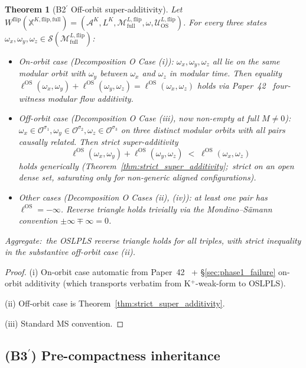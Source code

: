 \documentclass[11pt,a4paper]{article}
\theoremstyle{plain}
\newtheorem{theorem}{Theorem}[section]
\theoremstyle{definition}
\newcommand{\Acal}{\mathcal{A}}
\newcommand{\Scal}{\mathcal{S}}
\newcommand{\Mcal}{\mathcal{M}}
\newcommand{\Ucal}{\mathcal{U}}
\newcommand{\Ocal}{\mathcal{O}}
\newcommand{\ellOS}{\ell^{\mathrm{OS}}}
\newcommand{\Mflipfull}{\Mcal^{L,\mathrm{flip}}_{\mathrm{full}}}
\newcommand{\Wflip}{W^{\mathrm{flip}}}
\newcommand{\osXkrein}{\mathbb{X}^{K,\mathrm{flip},\mathrm{full}}}
\newcommand{\Oorb}[1]{\Ocal^{\sigma_{#1}}}
\begin{document}
\begin{theorem}[B2$^{\prime}$ Off-orbit super-additivity]
\label{thm:b2prime}
Let $\Wflip(\osXkrein)=(\Acal^{K},L^{K},\Mflipfull,\omega,
\Ucal^{L,\mathrm{flip}}_{\mathrm{OS}})$. For every three states
$\omega_{x},\omega_{y},\omega_{z}\in\Scal(\Mflipfull)$:
\begin{itemize}
\item[(i)] \emph{On-orbit case (Decomposition O Case (i)):}
$\omega_{x},\omega_{y},\omega_{z}$ all lie on the same modular orbit
with $\omega_{y}$ between $\omega_{x}$ and $\omega_{z}$ in modular
time. Then equality
$\ellOS(\omega_{x},\omega_{y})+\ellOS(\omega_{y},\omega_{z})=
\ellOS(\omega_{x},\omega_{z})$ holds via Paper~42~\cite{paper42}
four-witness modular flow additivity.
\item[(ii)] \emph{Off-orbit case (Decomposition O Case (iii), now
non-empty at full $M\ne 0$):} $\omega_{x}\in\Oorb{1},
\omega_{y}\in\Oorb{2},\omega_{z}\in\Oorb{3}$ on three distinct
modular orbits with all pairs causally related. Then strict
super-additivity
\[
  \ellOS(\omega_{x},\omega_{y})+\ellOS(\omega_{y},\omega_{z}) \;<\; \ellOS(\omega_{x},\omega_{z})
\]
holds generically (Theorem~\ref{thm:strict_super_additivity};\ strict
on an open dense set, saturating only for non-generic aligned
configurations).
\item[(iii)] \emph{Other cases (Decomposition O Cases (ii), (iv)):}
at least one pair has $\ellOS=-\infty$. Reverse triangle holds
trivially via the Mondino--S\"amann convention $\pm\infty\mp\infty=0$.
\end{itemize}
Aggregate:\ the OSLPLS reverse triangle holds for all triples, with
strict inequality in the substantive off-orbit case (ii).
\end{theorem}

\begin{proof}
(i) On-orbit case automatic from Paper~42~\cite{paper42} +
\S\ref{sec:phase1_failure} on-orbit additivity (which transports
verbatim from K$^{+}$-weak-form to OSLPLS).

(ii) Off-orbit case is Theorem~\ref{thm:strict_super_additivity}.

(iii) Standard MS convention.
\end{proof}

\subsection{(B3$^{\prime}$) Pre-compactness inheritance}
\label{sec:b3prime}
\end{document}
